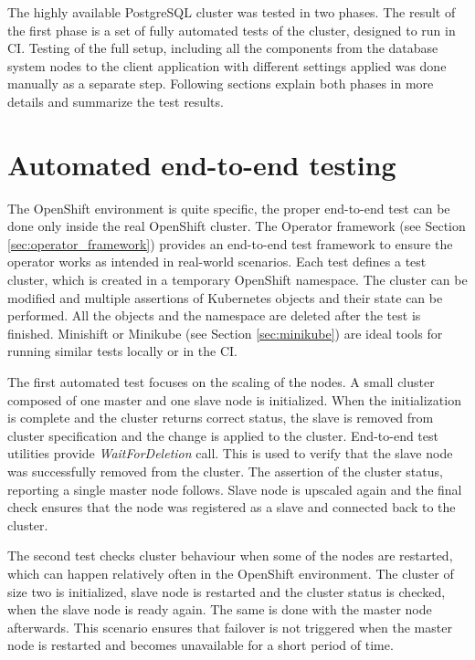 \documentclass[
  digital, %
  twoside, %
  table,   %
  nolof,   %
  nolot,   %
]{fithesis3}
\begin{document}
The highly available PostgreSQL cluster was tested in two phases. The result of the first phase is a set of fully automated tests of the cluster, designed to run in CI. Testing of the full setup, including all the components from the database system nodes to the client application with different settings applied was done manually as a separate step. Following sections explain both phases in more details and summarize the test results.

\section{Automated end-to-end testing}
The OpenShift environment is quite specific, the proper end-to-end test can be done only inside the real OpenShift cluster. The Operator framework (see Section \ref{sec:operator_framework}) provides an end-to-end test framework to ensure the operator works as intended in real-world scenarios. Each test defines a test cluster, which is created in a temporary OpenShift namespace. The cluster can be modified and multiple assertions of Kubernetes objects and their state can be performed. All the objects and the namespace are deleted after the test is finished. Minishift or Minikube (see Section \ref{sec:minikube}) are ideal tools for running similar tests locally or in the CI.

The first automated test focuses on the scaling of the nodes. A small cluster composed of one master and one slave node is initialized. When the initialization is complete and the cluster returns correct status, the slave is removed from cluster specification and the change is applied to the cluster. End-to-end test utilities provide \textit{WaitForDeletion} call. This is used to verify that the slave node was successfully removed from the cluster. The assertion of the cluster status, reporting a single master node follows.  Slave node is upscaled again and the final check ensures that the node was registered as a slave and connected back to the cluster.

The second test checks cluster behaviour when some of the nodes are restarted, which can happen relatively often in the OpenShift environment. The cluster of size two is initialized, slave node is restarted and the cluster status is checked, when the slave node is ready again. The same is done with the master node afterwards. This scenario ensures that failover is not triggered when the master node is restarted and becomes unavailable for a short period of time.
\end{document}
